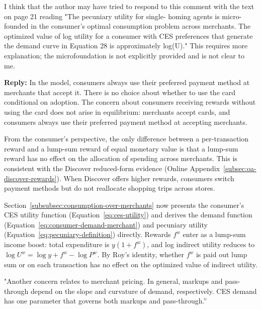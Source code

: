 \documentclass[main.tex]{subfiles}
\begin{document}
\begin{refsection}
\begin{refcommentnoclear}
I think that the author may have tried to respond to this comment with the text on page 21 reading "The pecuniary utility for single- homing agents is micro-founded in the consumer's optimal consumption problem across merchants.
The optimized value of log utility for a consumer with CES preferences that generate the demand curve in Equation 28 is approximately log(U)." This requires more explanation; the microfoundation is not explicitly provided and is not clear to me.

\end{refcommentnoclear}

\textbf{Reply:} In the model, consumers always use their preferred payment method at merchants that accept it.
There is no choice about whether to use the card conditional on adoption.
The concern about consumers receiving rewards without using the card does not arise in equilibrium: merchants accept cards, and consumers always use their preferred payment method at accepting merchants.

From the consumer's perspective, the only difference between a per-transaction reward and a lump-sum reward of equal monetary value is that a lump-sum reward has no effect on the allocation of spending across merchants.
This is consistent with the Discover reduced-form evidence (Online Appendix~\ref{subsec:oa-discover-rewards}). 
When Discover offers higher rewards, consumers switch payment methods but do not reallocate shopping trips across stores.

Section~\ref{subsubsec:consumption-over-merchants} now presents the consumer's CES utility function (Equation~\ref{eq:ces-utility}) and derives the demand function (Equation~\ref{eq:consumer-demand-merchant}) and pecuniary utility (Equation~\ref{eq:pecuniary-definition}) directly.
Rewards $f^w$ enter as a lump-sum income boost: total expenditure is $y(1+f^w)$, and log indirect utility reduces to $\log U^w = \log y + f^w - \log P^w$.
By Roy's identity, whether $f^w$ is paid out lump sum or on each transaction has no effect on the optimized value of indirect utility.

\begin{refcommentnoclear}
"Another concern relates to merchant pricing.
In general, markups and pass-through depend on the slope and curvature of demand, respectively.
CES demand has one parameter that governs both markups and pass-through.”


\end{refcommentnoclear}
\end{refsection}
\end{document}
